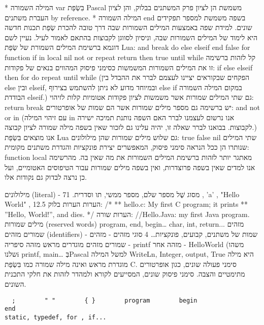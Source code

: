       * המילה השמורה var בִּשְׂפַת   Pascal משמשת הן לציון פרק המשתנים בבלוק, והן לציון העברת משתנים by reference.
      * המילה השמורה end בשפה משמשת למספר תפקידים שונים.
      למידת שפה באמצעות המילים השמורות שבה
      דרך טובה להכרת שְׂפַת תכנות חדשה היא לימוד של המילים השמורות שבה, וניסיון לסווגן לקבוצות בהתאם לאמור לעיל. נעיין לשם דוגמא ברשימת המילים השמורת של שְׂפַת Lua:
      and break do else elseif end false for function if in local nil not or repeat return then true until while
      קל לזהות ברשימה זו את המילים השמורות המשמשות כסימני פיסוק המהווים בנאים של פקודות:
      if else elseif then for do repeat until while
      (הפקחים שבקוראים יציינו לעצמם לברר את ההבדל בין else ובין elseif, ובמיוחד מדוע לא ניתן להשתמש בצירוף else if במקום המילה השמורה הבודדת elseif.)
      גם שתי המילים שמורות אשר משמשות לציון פקודות אטומיות  קלות לזיהוי:
      return break
      יש ברשימה גם מספר מילים שמורות אשר הם שמות של אופרטורים:
      and not or in
      (עם זיהוי המילה in אנו נרשום לעצמנו לברר האם השפה נותנת תמיכה ישירה לקבוצות. בבואנו לברר שאלה זו, יהיה עלינו גם לזכור שאין בשפה מילה שמורה לציון קבוצה.)
      אנו מוצאים בִּשְׂפַת  Lua גם שלוש מילים שמורות שהן מילולונים:
      true false nil
      שתי המילים שנותרו הן ככל הנראה סימני פיסוק, המאפשרים יצירת פונקציות והגדרת משתנים מקומית:
      function local
      מאתגר יותר לזהות ברשימת המילים השמורות את מה שאין בה. מהרשימה אנו למדים שאין בשפה פרוצדרות, ואין בשפה מילים שמורות עבור הטיפוסים האטומיים, ועל כן נרצה לבדוק גם נקודות אלו.

      מילולונים (literal) - מסוג שֶׁל מספר שלם, מספר ממשי, תו וסדרית.
      71 , 'a' , "Hello World" , 12.5
      הערות
      הערות בלוק:
      /*
      ** hello.c: My first C program; it prints
      ** ”Hello, World!”, and dies.
      */
      הערות שורה:
      //Hello.Java: my first Java program.
      מילים שמורות (reserved words)
      program, end, begin…
      char, int, return...        מזהים שמורים
      מזהים (identifiers) - שמות של משתנים, קבועים, פונקציות…
      4 סוגי מזהים -
      מזהים שמורים
      מזהים מוגדרים מראש
      מזהה סיפריה - printf
      מזהה אחר - HelloWorld (משהו שלנו^^)
      printf, main…
      בְּPascal למשל המילה WriteLn, Integer, output, True
      היא מילה מוגדרת מראש ואינה מילה שמורה כמו בִּשְׂפַת C.
      סימני פעולה שונים, כגון אופרטורים מתימטיים והצבה.
      סימני פיסוק שונים, המסייעים לקורא ולמהדר לזהות את חלקי התכנית השונים.
      \begin{verbatim}
  ;        " "        { }        program        begin                end
static, typedef, for , if...
      \end{verbatim}


